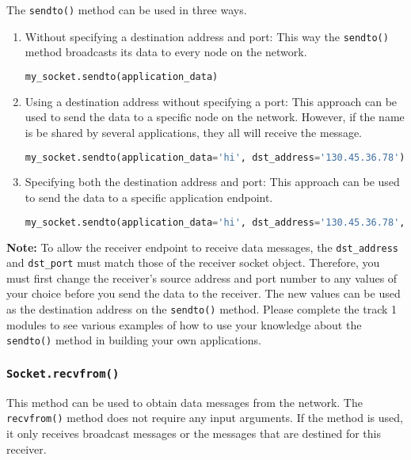 \documentclass[11pt]{article}
\begin{document}
The \texttt{sendto()} method can be used in three ways.
\begin{enumerate}
    \item Without specifying a destination address and port: This way the \texttt{sendto()} method broadcasts its data to every node on the network.
\begin{lstlisting}[caption={Not specifying any destination (i.e. broadcasting)}, language=Python]
my_socket.sendto(application_data)
\end{lstlisting}

    \item Using a destination address without specifying a port: This approach can be used to send the data to a specific node on the network. However, if the name is be shared by several applications, they all will receive the message.
\begin{lstlisting}[caption={Specifying just the destination address}, language=Python]
my_socket.sendto(application_data='hi', dst_address='130.45.36.78')
\end{lstlisting}

    \item Specifying both the destination address and port: This approach can be used to send the data to a specific application endpoint.
\begin{lstlisting}[caption={Specifying both destination address and port}, language=Python]
my_socket.sendto(application_data='hi', dst_address='130.45.36.78', dst_port='app1')
\end{lstlisting}

\end{enumerate}

\textbf{Note:}
To allow the receiver endpoint to receive data messages, the \texttt{dst\_address} and \texttt{dst\_port} must match those of the receiver socket object.
Therefore, you must first change the receiver's source address and port number to any values of your choice before you send the data to the receiver.
The new values can be used as the destination address on the \texttt{sendto()} method.
Please complete the track 1 modules to see various examples of how to use your knowledge about the \texttt{sendto()} method in building your own applications.

\subsubsection{\texttt{Socket.recvfrom()}}
This method can be used to obtain data messages from the network. The \texttt{recvfrom()} method does not require any input arguments. If the method is used, it only receives broadcast messages or the messages that are destined for this receiver.
\end{document}
